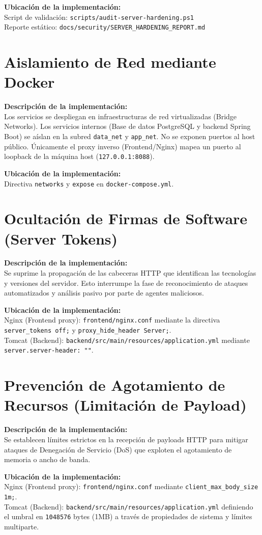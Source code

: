 \documentclass[12pt,a4paper]{article}
\begin{document}
\noindent\textbf{Ubicación de la implementación:}\\
Script de validación: \texttt{scripts/audit-server-hardening.ps1}\\
Reporte estático: \texttt{docs/security/SERVER\_HARDENING\_REPORT.md}

\section{Aislamiento de Red mediante Docker}
\textbf{Descripción de la implementación:}\\
Los servicios se despliegan en infraestructuras de red virtualizadas (Bridge Networks). Los servicios internos (Base de datos PostgreSQL y backend Spring Boot) se aíslan en la subred \texttt{data\_net} y \texttt{app\_net}. No se exponen puertos al host público. Únicamente el proxy inverso (Frontend/Nginx) mapea un puerto al loopback de la máquina host (\texttt{127.0.0.1:8088}).

\noindent\textbf{Ubicación de la implementación:}\\
Directiva \texttt{networks} y \texttt{expose} en \texttt{docker-compose.yml}.

\section{Ocultación de Firmas de Software (Server Tokens)}
\textbf{Descripción de la implementación:}\\
Se suprime la propagación de las cabeceras HTTP que identifican las tecnologías y versiones del servidor. Esto interrumpe la fase de reconocimiento de ataques automatizados y análisis pasivo por parte de agentes maliciosos.

\noindent\textbf{Ubicación de la implementación:}\\
Nginx (Frontend proxy): \texttt{frontend/nginx.conf} mediante la directiva \texttt{server\_tokens off;} y \texttt{proxy\_hide\_header Server;}.\\
Tomcat (Backend): \texttt{backend/src/main/resources/application.yml} mediante \texttt{server.server-header: ""}.

\section{Prevención de Agotamiento de Recursos (Limitación de Payload)}
\textbf{Descripción de la implementación:}\\
Se establecen límites estrictos en la recepción de payloads HTTP para mitigar ataques de Denegación de Servicio (DoS) que exploten el agotamiento de memoria o ancho de banda. 

\noindent\textbf{Ubicación de la implementación:}\\
Nginx (Frontend proxy): \texttt{frontend/nginx.conf} mediante \texttt{client\_max\_body\_size 1m;}.\\
Tomcat (Backend): \texttt{backend/src/main/resources/application.yml} definiendo el umbral en \texttt{1048576} bytes (1MB) a través de propiedades de sistema y límites multiparte.
\end{document}
